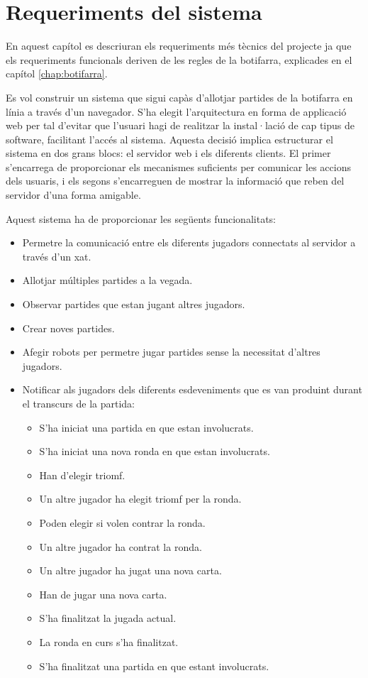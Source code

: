 

\chapter{Requeriments del sistema}
\label{chap:requeriments}

En aquest capítol es descriuran els requeriments més tècnics del projecte ja que els requeriments funcionals  deriven de les regles  de la botifarra, explicades en el capítol \ref{chap:botifarra}.

Es vol construir un sistema que sigui capàs d'allotjar partides de la botifarra en línia a través d'un navegador. S'ha elegit l'arquitectura en forma de applicació web per tal d'evitar que l'usuari hagi de realitzar la instal·lació de cap tipus de software, facilitant l'accés al sistema. Aquesta decisió implica estructurar el sistema en dos grans blocs: el servidor web i els diferents clients. El primer s'encarrega de proporcionar els mecanismes suficients per comunicar les accions dels usuaris, i els segons s'encarreguen de mostrar la informació que reben del servidor d'una forma amigable. 

Aquest sistema ha de proporcionar les següents funcionalitats: 

\begin{itemize}
\item{Permetre la comunicació entre els diferents jugadors connectats al servidor a través d'un xat.}
\item{Allotjar múltiples partides a la vegada.}
\item{Observar partides que estan jugant altres jugadors.}
\item{Crear noves partides.}
\item{Afegir robots per permetre jugar partides sense la necessitat d'altres jugadors.}
\item{
    Notificar als jugadors dels diferents esdeveniments que es van produint durant el transcurs de la partida:
    \begin{itemize}
        \item{S'ha iniciat una partida en que estan involucrats.}
        \item{S'ha iniciat una nova ronda en que estan involucrats.}
        \item{Han d'elegir triomf.}
        \item{Un altre jugador ha elegit triomf per la ronda.}
        \item{Poden elegir si volen contrar la ronda.}
        \item{Un altre jugador ha contrat la ronda.}
        \item{Un altre jugador ha jugat una nova carta.}
        \item{Han de jugar una nova carta.}
        \item{S'ha finalitzat la jugada actual.}
        \item{La ronda en curs s'ha finalitzat.}
        \item{S'ha finalitzat una partida en que estant involucrats.}
    \end{itemize}
}
\end{itemize}

